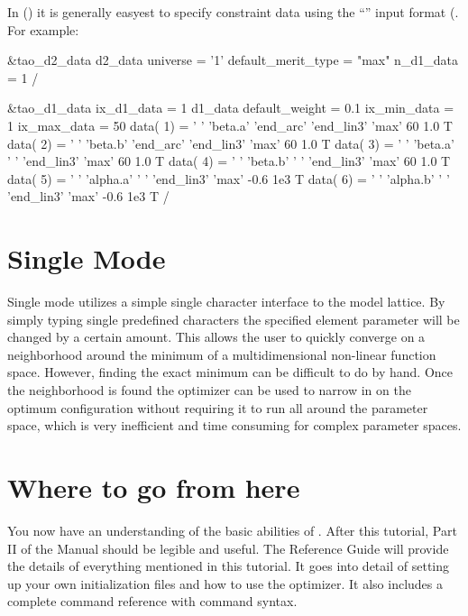 In  () it is generally
easyest to specify constraint data using the ``''
input format (. For example:
\begin{example}
&tao_d2_data
  d2_data%
  universe = '1'
  default_merit_type = "max"
  n_d1_data = 1
/

&tao_d1_data
  ix_d1_data = 1
  d1_data%
  default_weight = 0.1
  ix_min_data = 1
  ix_max_data = 50
  data( 1) = ' '  'beta.a'  'end_arc' 'end_lin3' 'max'    60   1.0   T
  data( 2) = ' '  'beta.b'  'end_arc' 'end_lin3' 'max'    60   1.0   T
  data( 3) = ' '  'beta.a'  ' '       'end_lin3' 'max'    60   1.0   T
  data( 4) = ' '  'beta.b'  ' '       'end_lin3' 'max'    60   1.0   T
  data( 5) = ' '  'alpha.a' ' '       'end_lin3' 'max'   -0.6  1e3   T 
  data( 6) = ' '  'alpha.b' ' '       'end_lin3' 'max'   -0.6  1e3   T 
/
\end{example}


\section{Single Mode}
\label{s:single_mode}

Single mode utilizes a simple single character interface to the \tao
model lattice.  By simply typing single predefined characters the
specified element parameter will be changed by a certain amount. This
allows the user to quickly converge on a neighborhood around the
minimum of a multidimensional non-linear function space. However,
finding the exact minimum can be difficult to do by hand. Once the
neighborhood is found the optimizer can be used to narrow in on the
optimum configuration without requiring it to run all around the
parameter space, which is very inefficient and time consuming for
complex parameter spaces.


\section{Where to go from here}
\label{s:where_to_go}

You now have an understanding of the basic abilities of \tao. After
this tutorial, Part II of the \tao Manual should be legible and
useful.  The Reference Guide will provide the details of everything
mentioned in this tutorial.  It goes into detail of setting up your
own initialization files and how to use the optimizer. It also
includes a complete command reference with command syntax.

